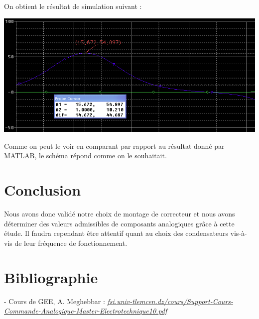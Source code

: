 \documentclass[11pt, french]{article} %
\begin{document}
On obtient le résultat de simulation suivant : 

\begin{center}
\includegraphics[width = 15cm]{Avph/simuAvph.png} 
\end{center}

Comme on peut le voir en comparant par rapport au résultat donné par MATLAB, le schéma répond comme on le souhaitait. 

\vspace{0.5cm}
\section{Conclusion}

\noindent
Nous avons donc validé notre choix de montage de correcteur et nous avons déterminer des valeurs admissibles de composants analogiques grâce à cette étude. Il faudra cependant être attentif quant au choix des condensateurs vis-à-vis de leur fréquence de fonctionnement.  

\pagebreak
\section{Bibliographie}

- Cours de GEE, A. Meghebbar :
\newline \textit{\underline{fsi.univ-tlemcen.dz/cours/Support-Cours-Commande-Analogique-Master-Electrotechnique10.pdf}}
\end{document}
